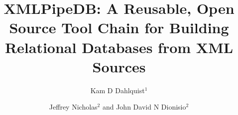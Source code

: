 \documentclass[10pt]{bmc_article}
\newenvironment{bmcformat}{\begin{raggedright}\baselineskip20pt\sloppy\setboolean{publ}{false}}{\end{raggedright}\baselineskip20pt\sloppy}
\begin{document}
\begin{bmcformat}



\title{XMLPipeDB: A Reusable, Open Source Tool Chain for Building Relational Databases from XML Sources}
 


\author{Kam D Dahlquist\correspondingauthor$^{1}$%
      \and
         Jeffrey Nicholas$^2$%
       and 
         {John David} N Dionisio\correspondingauthor$^2$%
      }
      


\address{%
    \iid(1)Department of Biology\\
    \iid(2)Department of Electrical Engineering \& Computer Science\\
    Seaver College of Science and Engineering, Loyola Marymount University, Los Angeles, California, USA
}%

\maketitle




\end{bmcformat}
\end{document}
